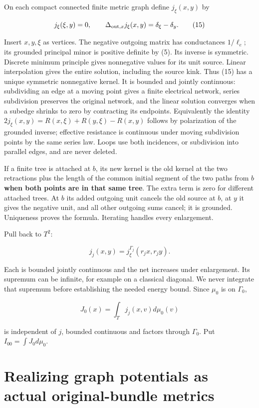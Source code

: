 \documentclass[
  11pt,
]{article}
\begin{document}
On each compact connected finite metric graph define \(j_\xi(x,y)\) by

\[
 j_\xi(\xi,y)=0,\qquad
 \Delta_{{\rm out},x}j_\xi(x,y)=\delta_\xi-\delta_y.                \tag{15}
\]

Insert \(x,y,\xi\) as vertices. The negative outgoing matrix has
conductances \(1/\ell_e\); its grounded principal minor is positive
definite by (5). Its inverse is symmetric. Discrete minimum principle
gives nonnegative values for its unit source. Linear interpolation gives
the entire solution, including the source kink. Thus (15) has a unique
symmetric nonnegative kernel. It is bounded and jointly continuous:
subdividing an edge at a moving point gives a finite electrical network,
series subdivision preserves the original network, and the linear
solution converges when a subedge shrinks to zero by contracting its
endpoints. Equivalently the identity
\(2j_\xi(x,y)=R(x,\xi)+R(y,\xi)-R(x,y)\) follows by polarization of the
grounded inverse; effective resistance is continuous under moving
subdivision points by the same series law. Loops use both incidences, or
subdivision into parallel edges, and are never deleted.

If a finite tree is attached at \(b\), its new kernel is the old kernel
at the two retractions plus the length of the common initial segment of
the two paths from \(b\) \textbf{when both points are in that same
tree}. The extra term is zero for different attached trees. At \(b\) its
added outgoing unit cancels the old source at \(b\), at \(y\) it gives
the negative unit, and all other outgoing sums cancel; it is grounded.
Uniqueness proves the formula. Iterating handles every enlargement.

Pull back to \(T^2\):

\[
             j_j(x,y)=j_\xi^{\Gamma_j}(r_jx,r_jy).
\]

Each is bounded jointly continuous and the net increases under
enlargement. Its supremum can be infinite, for example on a classical
diagonal. We never integrate that supremum before establishing the
needed energy bound. Since \(\mu_0\) is on \(\Gamma_0\),

\[
 J_0(x)=\int_T j_j(x,v)d\mu_0(v)
\]

is independent of \(j\), bounded continuous and factors through
\(\Gamma_0\). Put \(I_{00}=\int J_0d\mu_0\).

\section{Realizing graph potentials as actual original-bundle
metrics}\label{realizing-graph-potentials-as-actual-original-bundle-metrics}
\end{document}
